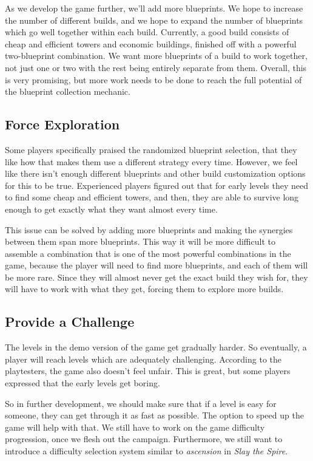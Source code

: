 As we develop the game further, we'll add more blueprints.
We hope to increase the number of different builds, and we hope to expand the number of blueprints which go well together within each build.
Currently, a good build consists of cheap and efficient towers and economic buildings, finished off with a powerful two-blueprint combination.
We want more blueprints of a build to work together, not just one or two with the rest being entirely separate from them.
Overall, this is very promising, but more work needs to be done to reach the full potential of the blueprint collection mechanic.

\subsection{Force Exploration}

Some players specifically praised the randomized blueprint selection, that they like how that makes them use a different strategy every time.
However, we feel like there isn't enough different blueprints and other build customization options for this to be true.
Experienced players figured out that for early levels they need to find some cheap and efficient towers, and then, they are able to survive long enough to get exactly what they want almost every time.

This issue can be solved by adding more blueprints and making the synergies between them span more blueprints.
This way it will be more difficult to assemble a combination that is one of the most powerful combinations in the game, because the player will need to find more blueprints, and each of them will be more rare.
Since they will almost never get the exact build they wish for, they will have to work with what they get, forcing them to explore more builds.

\subsection{Provide a Challenge}

The levels in the demo version of the game get gradually harder.
So eventually, a player will reach levels which are adequately challenging.
According to the playtesters, the game also doesn't feel unfair.
This is great, but some players expressed that the early levels get boring.

So in further development, we should make sure that if a level is easy for someone, they can get through it as fast as possible.
The option to speed up the game will help with that.
We still have to work on the game difficulty progression, once we flesh out the campaign.
Furthermore, we still want to introduce a difficulty selection system similar to \emph{ascension} in \emph{Slay the Spire}.